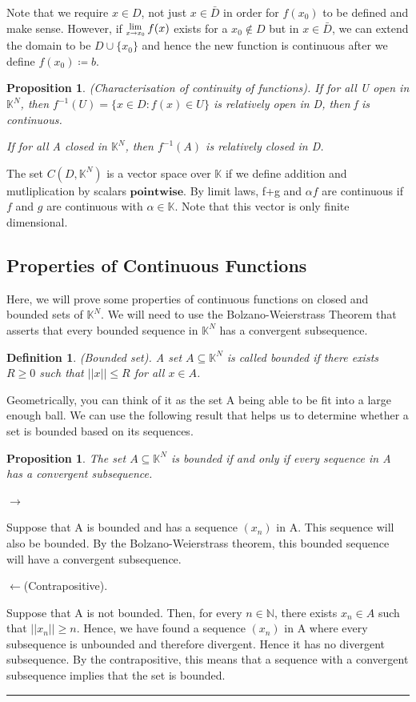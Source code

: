 \documentclass[twoside]{article}
\newcommand{\Lim}[1]{\raisebox{0.5ex}{\scalebox{0.8}{$\displaystyle \lim_{#1}\;$}}}
\newtheorem{proposition}[theorem]{Proposition}
\newtheorem{definition}[theorem]{Definition}
\newenvironment{proof}{{\bf Proof:}}{\hfill\rule{2mm}{2mm}}
\begin{document}
Note that we require $x \in D$, not just $x \in \bar{D}$ in order for $f(x_0)$ to be defined and make sense. However, if $\Lim{x \rightarrow x_0}f(x)$ exists for a $x_0 \not \in D$ but in $x \in \bar{D}$, we can extend the domain to be $D \cup \{x_0\}$ and hence the new function is continuous after we define $f(x_0) \coloneqq b$. 

\begin{proposition}(Characterisation of continuity of functions). If for all U open in $\mathbb{K}^N$, then $f^{-1}(U) = \{x \in D: f(x) \in U\}$ is relatively open in D, then f is continuous.

If for all A closed in $\mathbb{K}^N$, then $f^{-1}(A)$ is relatively closed in D.
\end{proposition}
The set $C(D, \mathbb{K}^N)$ is a vector space over $\mathbb{K}$ if we define addition and mutliplication by scalars $\textbf{pointwise}$. By limit laws, f+g and $\alpha f$ are continuous if $f$ and $g$ are continuous with $\alpha \in \mathbb{K}$. Note that this vector is only finite dimensional.

\subsection{Properties of Continuous Functions}

Here, we will prove some properties of continuous functions on closed and bounded sets of $\mathbb{K}^N$. We will need to use the Bolzano-Weierstrass Theorem that asserts that every bounded sequence in $\mathbb{K}^N$ has a convergent subsequence.

\begin{definition}(Bounded set). A set $A \subseteq \mathbb{K}^N$ is called bounded if there exists $R \geq 0$ such that $||x|| \leq R$ for all $x \in A$.
\end{definition}

Geometrically, you can think of it as the set A being able to be fit into a large enough ball. We can use the following result that helps us to determine whether a set is bounded based on its sequences.

\begin{proposition}The set $A \subseteq \mathbb{K}^N$ is bounded if and only if every sequence in A has a convergent subsequence.
\end{proposition}

\begin{proof} 

$\rightarrow$

Suppose that A is bounded and has a sequence $(x_n)$ in A. This sequence will also be bounded. By the Bolzano-Weierstrass theorem, this bounded sequence will have a convergent subsequence.

$\leftarrow$(Contrapositive).

Suppose that A is not bounded. Then, for every $n \in \mathbb{N}$, there exists $x_n \in A$ such that $||x_n|| \geq n$. Hence, we have found a sequence $(x_n)$ in A where every subsequence is unbounded and therefore divergent. Hence it has no divergent subsequence. By the contrapositive, this means that a sequence with a convergent subsequence implies that the set is bounded.
\end{proof}
\end{document}
